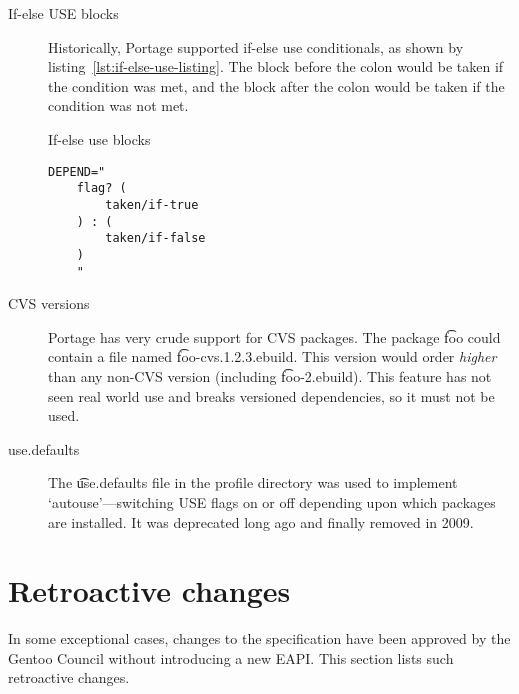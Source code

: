 \begin{description}
\item[If-else USE blocks]
Historically, Portage supported if-else use conditionals, as shown by
listing~\ref{lst:if-else-use-listing}. The block before the colon would be taken if the condition
was met, and the block after the colon would be taken if the condition was not met.

\begin{listing}
\caption{If-else use blocks} \label{lst:if-else-use-listing}
\begin{verbatim}
DEPEND="
    flag? (
        taken/if-true
    ) : (
        taken/if-false
    )
    "
\end{verbatim}
\end{listing}

\item[CVS versions]
Portage has very crude support for CVS packages. The package \t{foo} could contain a file named
\t{foo-cvs.1.2.3.ebuild}. This version would order \emph{higher} than any non-CVS version (including
\t{foo-2.ebuild}). This feature has not seen real world use and breaks versioned dependencies, so
it must not be used.

\item[use.defaults]
The \t{use.defaults} file in the profile directory was used to implement `autouse'---switching USE
flags on or off depending upon which packages are installed. It was deprecated long ago and finally
removed in 2009.

\end{description}

\section{Retroactive changes}

In some exceptional cases, changes to the specification have been approved by the Gentoo Council
without introducing a new EAPI\@. This section lists such retroactive changes.


